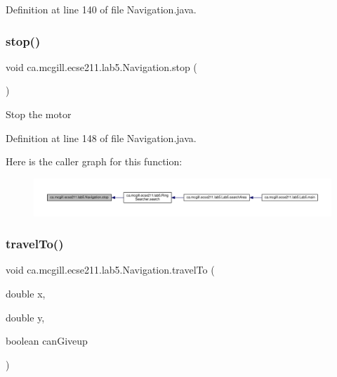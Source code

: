 Definition at line 140 of file Navigation.\+java.

\mbox{\label{classca_1_1mcgill_1_1ecse211_1_1lab5_1_1_navigation_afe038af6692e7ad28c3587cd979d7223}} 
\subsubsection{\texorpdfstring{stop()}{stop()}}
{\footnotesize\ttfamily void ca.\+mcgill.\+ecse211.\+lab5.\+Navigation.\+stop (\begin{DoxyParamCaption}{ }\end{DoxyParamCaption})}

Stop the motor 

Definition at line 148 of file Navigation.\+java.

Here is the caller graph for this function\+:
\nopagebreak
\begin{figure}[H]
\begin{center}
\leavevmode
\includegraphics[width=350pt]{classca_1_1mcgill_1_1ecse211_1_1lab5_1_1_navigation_afe038af6692e7ad28c3587cd979d7223_icgraph}
\end{center}
\end{figure}
\mbox{\label{classca_1_1mcgill_1_1ecse211_1_1lab5_1_1_navigation_a0f3288c38c7c28b495ae4d7e95d85f78}} 
\subsubsection{\texorpdfstring{travel\+To()}{travelTo()}}
{\footnotesize\ttfamily void ca.\+mcgill.\+ecse211.\+lab5.\+Navigation.\+travel\+To (\begin{DoxyParamCaption}\item[{double}]{x,  }\item[{double}]{y,  }\item[{boolean}]{can\+Giveup }\end{DoxyParamCaption})}

